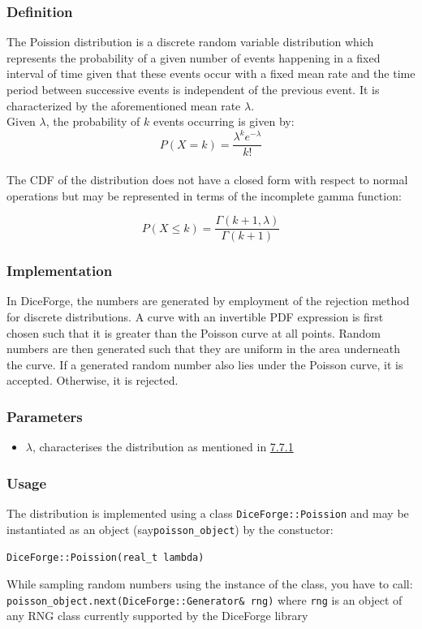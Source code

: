 \documentclass[titlepage, 11pt]{article}
\newcommand{\code}[1]
{\colorbox{light-gray}{\texttt{#1}}}
\begin{document}
\subsubsection{Definition} \label{sec:7.7.1}
The Poission distribution is a discrete random variable distribution which represents the probability of a given number of events happening in a fixed interval of time given that these events occur with a fixed mean rate and the time period between successive events is independent of the previous event.
It is characterized by the aforementioned mean rate $\lambda$.\\
Given $\lambda$, the probability of $k$ events occurring is given by:
$$P(X=k)=\frac{\lambda ^{k}e^{-\lambda }}{k!}$$
\\
The CDF of the distribution does not have a closed form with respect to normal operations but may be represented in terms of the incomplete gamma function:

$$P(X \leq k)=\frac{\Gamma(k+1,\lambda)}{\Gamma(k+1)}$$

\subsubsection{Implementation}
In DiceForge, the numbers are generated by employment of the rejection method for discrete distributions. A curve with an invertible PDF expression is first chosen such that it is greater than the Poisson curve at all points. Random numbers are then generated such that they are uniform in the area underneath the curve. If a generated random number also lies under the Poisson curve, it is accepted. Otherwise, it is rejected.\\

\subsubsection{Parameters}

\begin{itemize}
\item $\lambda$, characterises the distribution as mentioned in \hyperref[sec:7.7.1]{7.7.1}
\end{itemize}

\subsubsection{Usage}
The distribution is implemented using a class \code{DiceForge::Poission} and may be instantiated as an object (say\code{poisson\_object}) by the constuctor:
\begin{center}
\code{DiceForge::Poission(real\_t lambda)}
\end{center}
While sampling random numbers using the instance of the class, you have to call:\\
\code{poisson\_object.next(DiceForge::Generator\& rng)} where \code{rng} is an object of any RNG class currently supported by the DiceForge library
\end{document}
